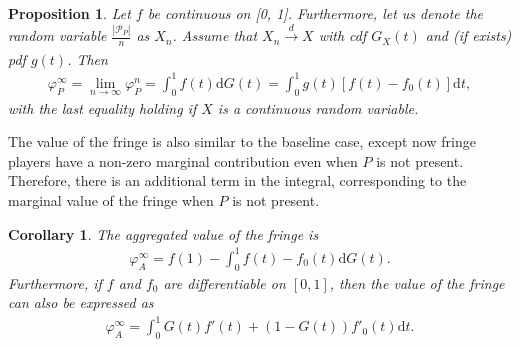 \documentclass[a4paper]{article}
\newtheorem{proposition}{Proposition}
\newtheorem{corollary}{Corollary}
\newcommand{\dt}{\mathrm{d}t}
\newcommand{\dG}{\mathrm{d}G}
\begin{document}
\begin{proposition}
    \label{prop:one_sided_non_indispensable}
    Let $f$ be continuous on [0, 1]. Furthermore, let us denote the random variable $\frac{|\mathcal{P}_P|}{n}$ as $X_n$. Assume that $X_n \xrightarrow[]{d} X$ with cdf $G_X(t)$ and (if exists) pdf $g(t)$.
    Then
    \begin{align*}
        \varphi_P^\infty = \lim_{n \to \infty} \varphi_P^n = \int_0^1 f(t) \dG(t) = \int_0^1 g(t) [f(t) - f_0(t)] \dt,
    \end{align*}
    with the last equality holding if $X$ is a continuous random variable.
\end{proposition}

The value of the fringe is also similar to the baseline case, except now fringe players have a non-zero marginal contribution even when $P$ is not present.
Therefore, there is an additional term in the integral, corresponding to the marginal value of the fringe when $P$ is not present.

\begin{corollary}
    \label{cor:fringe_value_non_indispensable}
    The aggregated value of the fringe is
    \begin{align*}
        \varphi_A^\infty = f(1) - \int_0^1 f(t) - f_0(t) \dG(t).
    \end{align*}
    Furthermore, if $f$ and $f_0$ are differentiable on $[0, 1]$, then the value of the fringe can also be expressed as
    \begin{align*}
        \varphi_A^\infty = \int_0^1 G(t) f'(t) + (1 - G(t)) f'_0(t) \dt.
    \end{align*}
\end{corollary}
\end{document}
